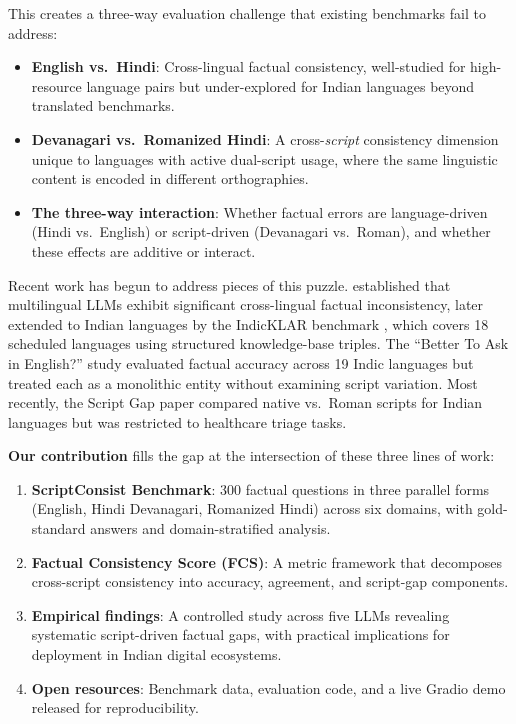 \documentclass[11pt,a4paper]{article}
\begin{document}
This creates a three-way evaluation challenge that existing benchmarks fail to address:
\begin{itemize}
    \item \textbf{English vs.\ Hindi}: Cross-lingual factual consistency, well-studied for high-resource language pairs but under-explored for Indian languages beyond translated benchmarks.
    \item \textbf{Devanagari vs.\ Romanized Hindi}: A cross-\textit{script} consistency dimension unique to languages with active dual-script usage, where the same linguistic content is encoded in different orthographies.
    \item \textbf{The three-way interaction}: Whether factual errors are language-driven (Hindi vs.\ English) or script-driven (Devanagari vs.\ Roman), and whether these effects are additive or interact.
\end{itemize}

Recent work has begun to address pieces of this puzzle. \citet{qi2023crosslingual} established that multilingual LLMs exhibit significant cross-lingual factual inconsistency, later extended to Indian languages by the IndicKLAR benchmark \citep{indicklar2026}, which covers 18 scheduled languages using structured knowledge-base triples. The ``Better To Ask in English?'' study \citep{rohera2025betterask} evaluated factual accuracy across 19 Indic languages but treated each as a monolithic entity without examining script variation. Most recently, the Script Gap paper \citep{scriptgap2025} compared native vs.\ Roman scripts for Indian languages but was restricted to healthcare triage tasks.

\textbf{Our contribution} fills the gap at the intersection of these three lines of work:
\begin{enumerate}
    \item \textbf{ScriptConsist Benchmark}: 300 factual questions in three parallel forms (English, Hindi Devanagari, Romanized Hindi) across six domains, with gold-standard answers and domain-stratified analysis.
    \item \textbf{Factual Consistency Score (FCS)}: A metric framework that decomposes cross-script consistency into accuracy, agreement, and script-gap components.
    \item \textbf{Empirical findings}: A controlled study across five LLMs revealing systematic script-driven factual gaps, with practical implications for deployment in Indian digital ecosystems.
    \item \textbf{Open resources}: Benchmark data, evaluation code, and a live Gradio demo released for reproducibility.
\end{enumerate}
\end{document}

